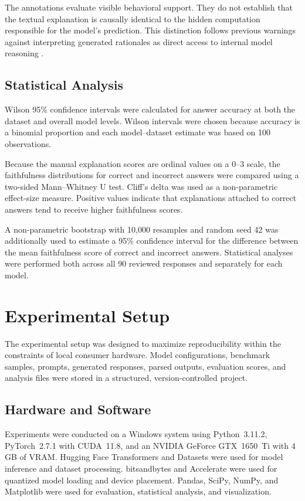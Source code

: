 \documentclass{article}
\begin{document}
The annotations evaluate visible behavioral support. They do not
establish that the textual explanation is causally identical to the
hidden computation responsible for the model's prediction. This
distinction follows previous warnings against interpreting generated
rationales as direct access to internal model reasoning
\cite{turpin2023language,lanham2023measuring}.

\subsection{Statistical Analysis}

Wilson 95\% confidence intervals were calculated for answer accuracy
at both the dataset and overall model levels. Wilson intervals were
chosen because accuracy is a binomial proportion and each
model--dataset estimate was based on 100 observations.

Because the manual explanation scores are ordinal values on a 0--3
scale, the faithfulness distributions for correct and incorrect answers
were compared using a two-sided Mann--Whitney U test. Cliff's delta was
used as a non-parametric effect-size measure. Positive values indicate
that explanations attached to correct answers tend to receive higher
faithfulness scores.

A non-parametric bootstrap with 10,000 resamples and random seed 42
was additionally used to estimate a 95\% confidence interval for the
difference between the mean faithfulness score of correct and incorrect
answers. Statistical analyses were performed both across all 90
reviewed responses and separately for each model.

\section{Experimental Setup}

The experimental setup was designed to maximize reproducibility within
the constraints of local consumer hardware. Model configurations,
benchmark samples, prompts, generated responses, parsed outputs,
evaluation scores, and analysis files were stored in a structured,
version-controlled project.

\subsection{Hardware and Software}

Experiments were conducted on a Windows system using Python~3.11.2,
PyTorch~2.7.1 with CUDA~11.8, and an NVIDIA GeForce GTX~1650~Ti
with 4\,GB of VRAM. Hugging Face Transformers and Datasets were used
for model inference and dataset processing. bitsandbytes and Accelerate
were used for quantized model loading and device placement. Pandas,
SciPy, NumPy, and Matplotlib were used for evaluation, statistical
analysis, and visualization.
\end{document}
